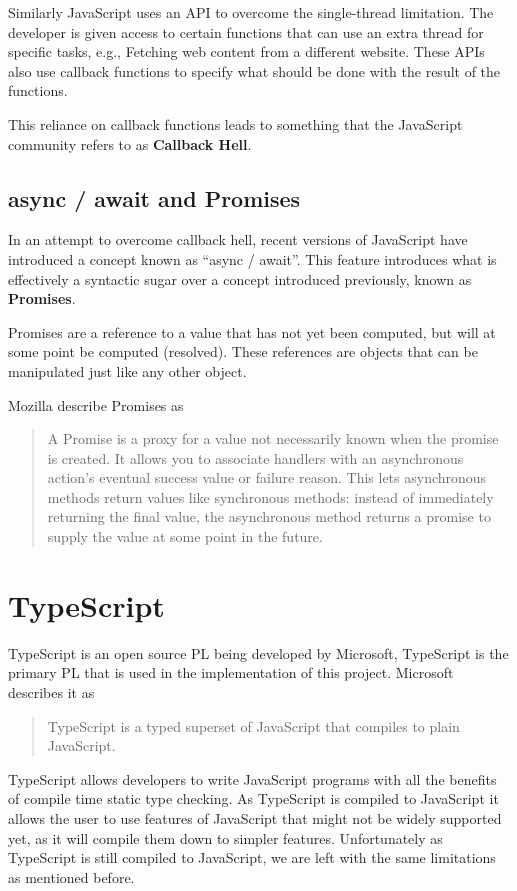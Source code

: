 Similarly JavaScript uses an API to overcome the single-thread limitation. The developer is given access to certain functions that can use an extra thread for specific tasks, e.g., Fetching web content from a different website. These APIs also use callback functions to specify what should be done with the result of the functions.

This reliance on callback functions leads to something that the JavaScript community refers to as \textbf{Callback Hell}.

\subsection{async / await and Promises}\label{background:asyncawait}

In an attempt to overcome callback hell, recent versions of JavaScript have introduced a concept known as ``async / await''.\cite{es8spec} This feature introduces what is effectively a syntactic sugar over a concept introduced previously, known as \textbf{Promises}.

Promises are a reference to a value that has not yet been computed, but will at some point be computed (resolved). These references are objects that can be manipulated just like any other object.

Mozilla describe Promises as
\begin{quote}
A Promise is a proxy for a value not necessarily known when the promise is created. It allows you to associate handlers with an asynchronous action's eventual success value or failure reason. This lets asynchronous methods return values like synchronous methods: instead of immediately returning the final value, the asynchronous method returns a promise to supply the value at some point in the future.
    \cite{mozillapromises}
\end{quote}

\section{TypeScript}
TypeScript is an open source PL being developed by Microsoft, TypeScript is the primary PL that is used in the implementation of this project. Microsoft describes it as

\begin{quote}
TypeScript is a typed superset of JavaScript that compiles to plain JavaScript.\cite{microsoftts}
\end{quote}

TypeScript allows developers to write JavaScript programs with all the benefits of compile time static type checking. As TypeScript is compiled to JavaScript it allows the user to use features of JavaScript that might not be widely supported yet, as it will compile them down to simpler features. Unfortunately as TypeScript is still compiled to JavaScript, we are left with the same limitations as mentioned before.

